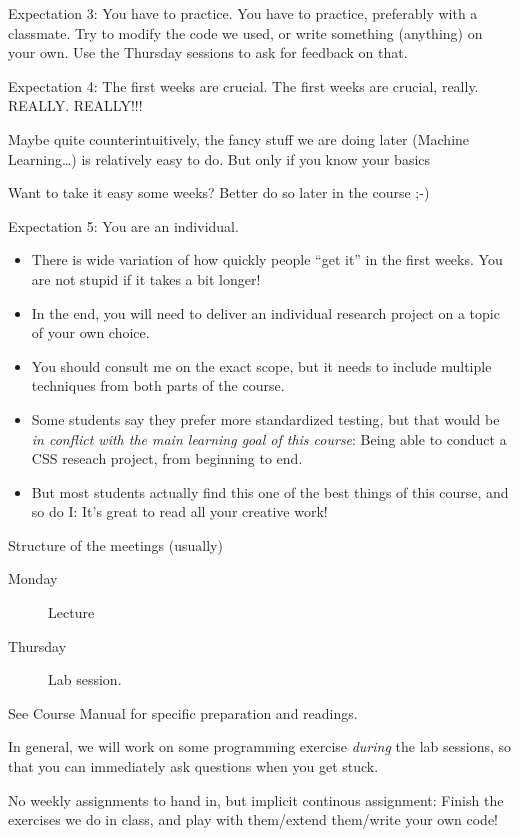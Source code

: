 \begin{frame}{Expectation 3: You have to practice.}
	You have to practice, preferably with a classmate. Try to modify the code we used, or write something (anything) on your own. Use the Thursday sessions to ask for feedback on that.
\end{frame}



\begin{frame}{Expectation 4: The first weeks are crucial.}
The first weeks are crucial, really. REALLY. REALLY!!!

Maybe quite counterintuitively, the fancy stuff we are doing later (Machine Learning\ldots) is relatively easy to do. But only if you know your basics %

Want to take it easy some weeks? Better do so later in the course ;-)
\end{frame}


\begin{frame}{Expectation 5: You are an individual.}
\begin{itemize}
	\item There is wide variation of how quickly people ``get it'' in the first weeks. You are not stupid if it takes a bit longer!
	\item In the end, you will need to deliver an individual research project on a topic of your own choice.
	\item You should consult me on the exact scope, but it needs to include multiple techniques from both parts of the course.
	\item Some students say they prefer more standardized testing, but that would be \emph{in conflict with the main learning goal of this course}: Being able to conduct a CSS reseach project, from beginning to end.
	\item But most students actually find this one of the best things of this course, and so do I: It's great to read all your creative work!
\end{itemize}

\end{frame}


\begin{frame}{Structure of the meetings (usually)}
	\begin{description}
		\item[Monday] Lecture
		\item[Thursday]Lab session.
	\end{description}
See Course Manual for specific preparation and readings.

In general, we will work on some programming exercise \emph{during} the lab sessions, so that you can immediately ask questions when you get stuck.

No weekly assignments to hand in, but implicit continous assignment: Finish the exercises we do in class, and play with them/extend them/write your own code!
\end{frame}

